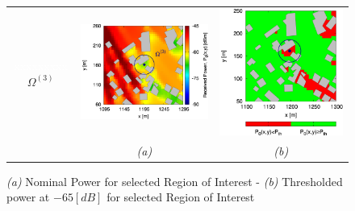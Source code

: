 \begin{figure}[H]
\begin{center}
\begin{tabular}{ccc}
\begin{sideways}\textcolor{white}{xxxxxxxxx}$\Omega^{(3)}$\end{sideways}&\includegraphics[scale=0.1]{./Figure/Planning.EM/RoI3/3/Fig.Received.Power.ZOOM.H-QoS-03.Reference.jpg}&\includegraphics[scale=0.1]{./Figure/Planning.EM/RoI3/3/Fig.Received.Power.ZOOM.RoI.Reference.Threshold.-65dBm.jpg}\tabularnewline
&\emph{(a)}&\emph{(b)}\tabularnewline
\end{tabular}\end{center}
\caption{\footnotesize \emph{(a)} Nominal Power for selected Region of Interest - \emph{(b)}
Thresholded power at $-65[dB]$ for selected Region of Interest}
\end{figure}


